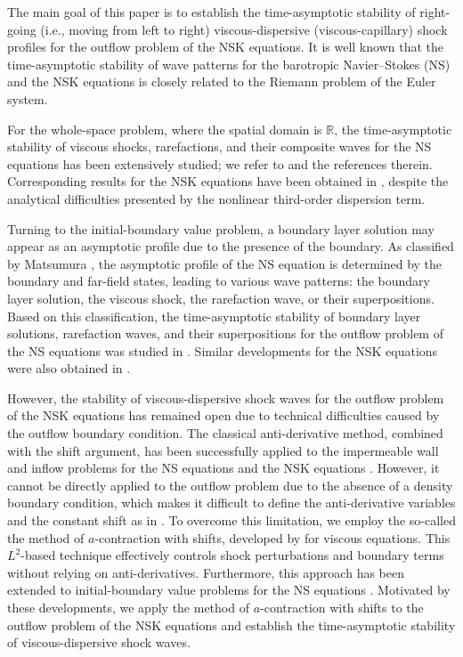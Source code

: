 \documentclass[11pt,reqno]{amsart}
\numberwithin{equation}{section} %
\newcommand{\R}{\mathbb{R}}
\begin{document}
The main goal of this paper is to establish the time-asymptotic stability of right-going (i.e., moving from left to right) viscous-dispersive (viscous-capillary) shock profiles for the outflow problem of the NSK equations. It is well known that the time-asymptotic stability of wave patterns for the barotropic Navier--Stokes (NS) and the NSK equations is closely related to the Riemann problem of the Euler system.

For the whole-space problem, where the spatial domain is $\R$, the time-asymptotic stability of viscous shocks, rarefactions, and their composite waves for the NS equations has been extensively studied; we refer to \cite{HKK23, KVW23, Liu86, MN85, MN86, SzepessyXin93} and the references therein. Corresponding results for the NSK equations have been obtained in \cite{C12,CHZ15,HKKL25-JDE,HK26}, despite the analytical difficulties presented by the nonlinear third-order dispersion term.

Turning to the initial-boundary value problem, a boundary layer solution may appear as an asymptotic profile due to the presence of the boundary. As classified by Matsumura \cite{MatBVP}, the asymptotic profile of the NS equation is determined by the boundary and far-field states, leading to various wave patterns: the boundary layer solution, the viscous shock, the rarefaction wave, or their superpositions. Based on this classification, the time-asymptotic stability of boundary layer solutions, rarefaction waves, and their superpositions for the outflow problem of the NS equations was studied in \cite{KNZ03, KZ08, KZ09}. Similar developments for the NSK equations were also obtained in \cite{Hong20, LTY22, LXC23, LZ21}. 


However, the stability of viscous-dispersive shock waves for the outflow problem of the NSK equations has remained open due to technical difficulties caused by the outflow boundary condition. The classical anti-derivative method, combined with the shift argument, has been successfully applied to the impermeable wall and inflow problems for the NS equations \cite{HMS03, MM99, MN01} and the NSK equations \cite{CLS19, Hong22}. However, it cannot be directly applied to the outflow problem due to the absence of a density boundary condition, which makes it difficult to define the anti-derivative variables and the constant shift as in \cite{MM99}. To overcome this limitation, we employ the so-called the method of $a$-contraction with shifts, developed by \cite{KV17, KV21, KV-Inven, KVW23} for viscous equations. This $L^2$-based technique effectively controls shock perturbations and boundary terms without relying on anti-derivatives. Furthermore, this approach has been extended to initial-boundary value problems for the NS equations \cite{HKKKO26,HKKL25-JMAA, KOW25}. Motivated by these developments, we apply the method of $a$-contraction with shifts to the outflow problem of the NSK equations and establish the time-asymptotic stability of viscous-dispersive shock waves.
\end{document}
